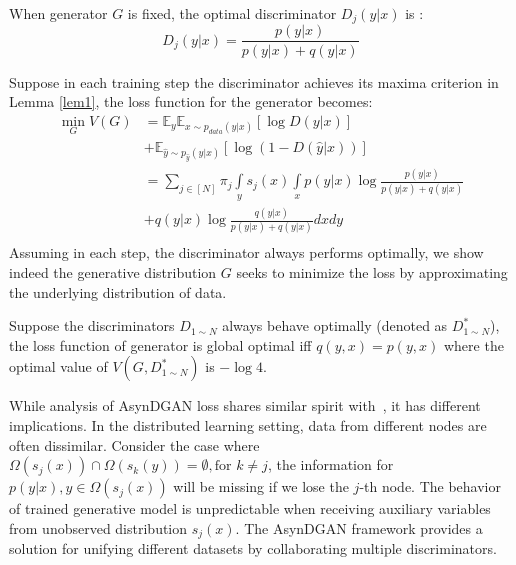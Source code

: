 \begin{lemma}\label{lem1}
	When generator $G$ is fixed,  the optimal discriminator $D_j(y|x)$ is :\\
	\vspace{-0.5em}
	\begin{equation}
	D_j(y|x)=\frac{p(y|x)}{p(y|x)+q(y|x)}
	\end{equation}
\end{lemma}


Suppose in each training step the discriminator achieves its maxima criterion in Lemma \ref{lem1}, the loss function for the generator becomes:\\
\begin{equation*}
\begin{aligned}
\min\limits_{G}V(G)&= \mathbb{E}_{y}\mathbb{E}_{x\sim p_{data}(y|x)} [\log D(y|x)] \\
&+\mathbb{E}_{\hat{y}\sim p_{\hat{y}}(\hat{y}|x)} [\log(1-D(\hat{y}|x))]\\
&=\sum_{j\in[N]} \pi_j\int\limits_{y} s_j(x)\int\limits_{x} p(y|x)\log\frac{p(y|x)}{p(y|x)+q(y|x)}\\
&+q(y|x)\log\frac{q(y|x)}{p(y|x)+q(y|x)} dxdy\\
\end{aligned}
\end{equation*}
Assuming in each step, the discriminator always performs optimally, we show indeed the generative distribution $G$ seeks to minimize the loss by approximating the underlying distribution of data.
\begin{thm}
	Suppose the discriminators $D_{1\sim N}$ always behave optimally (denoted as $D^*_{1 \sim N}$), the loss function of generator is global optimal iff $q(y,x)=p(y,x)$ where the optimal value of $V(G,D^*_{1\sim N})$ is $-\log 4$. 
\end{thm}

\begin{remark}
	While analysis of AsynDGAN loss shares similar spirit with~\cite{goodfellow2014generative}, it has different implications. In the distributed learning setting, data from different nodes are often dissimilar. Consider the case where $\Omega(s_j(x)) \cap \Omega(s_k(y)) =\emptyset, \text{for } k \neq j$, the information for $p(y|x), y\in \Omega(s_j(x))$ will be missing if we lose the $j$-th node. The behavior of trained generative model is unpredictable when receiving auxiliary variables from unobserved  distribution $s_j(x)$.
	The AsynDGAN framework provides a solution for unifying different datasets by collaborating multiple discriminators.
\end{remark}